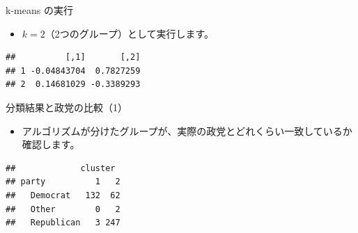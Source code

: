 \documentclass[
  ignorenonframetext,
]{beamer}
\newenvironment{Shaded}{\begin{snugshade}}{\end{snugshade}}
\newcommand{\AttributeTok}[1]{\textcolor[rgb]{0.77,0.63,0.00}{#1}}
\newcommand{\CommentTok}[1]{\textcolor[rgb]{0.56,0.35,0.01}{\textit{#1}}}
\newcommand{\DecValTok}[1]{\textcolor[rgb]{0.00,0.00,0.81}{#1}}
\newcommand{\FunctionTok}[1]{\textcolor[rgb]{0.00,0.00,0.00}{#1}}
\newcommand{\NormalTok}[1]{#1}
\newcommand{\OtherTok}[1]{\textcolor[rgb]{0.56,0.35,0.01}{#1}}
\newcommand{\SpecialCharTok}[1]{\textcolor[rgb]{0.00,0.00,0.00}{#1}}
\providecommand{\tightlist}{%
  \setlength{\itemsep}{0pt}\setlength{\parskip}{0pt}}
\begin{document}
\begin{frame}[fragile]{k-means の実行}
\protect\hypertarget{k-means-ux306eux5b9fux884c}{}
\begin{itemize}
\tightlist
\item
  \(k=2\)（2つのグループ）として実行します。
\end{itemize}

\scriptsize

\begin{Shaded}
\end{Shaded}

\begin{verbatim}
##          [,1]       [,2]
## 1 -0.04843704  0.7827259
## 2  0.14681029 -0.3389293
\end{verbatim}

\normalsize
\end{frame}

\begin{frame}[fragile]{分類結果と政党の比較（1）}
\protect\hypertarget{ux5206ux985eux7d50ux679cux3068ux653fux515aux306eux6bd4ux8f031}{}
\begin{itemize}
\tightlist
\item
  アルゴリズムが分けたグループが、実際の政党とどれくらい一致しているか確認します。
\end{itemize}

\scriptsize

\begin{Shaded}
\end{Shaded}

\begin{verbatim}
##             cluster
## party          1   2
##   Democrat   132  62
##   Other        0   2
##   Republican   3 247
\end{verbatim}

\normalsize
\end{frame}
\end{document}
